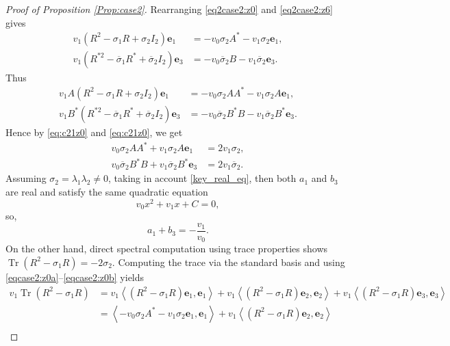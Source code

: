 \documentclass[12pt, reqno]{amsart}
\theoremstyle{definition}
\theoremstyle{remark}
\numberwithin{equation}{section}
\begin{document}
\begin{proof}[Proof of Proposition \ref{Prop:case2}]
	Rearranging \eqref{eq2case2:z0} and \eqref{eq2case2:z6} gives
	\begin{align}
		v_1 \left( R^2 - \sigma_1 R + \sigma_2 I_2 \right) \mathbf{e}_1 &= -v_0 \sigma_2 A^* - v_1\sigma_2 \mathbf{e}_1, \label{eqcase2:z0a} \\
		v_1 \left( R^{*2} - \overline{\sigma}_1 R^* + \overline{\sigma}_2 I_2 \right) \mathbf{e}_3 &= -v_0 \overline{\sigma}_2 B - v_1\overline{\sigma}_2 \mathbf{e}_3. \label{eqcase2:z0b}
	\end{align}
Thus
\begin{align*}
	v_1 A \left( R^2 - \sigma_1 R + \sigma_2 I_2 \right) \mathbf{e}_1 &= -v_0 \sigma_2 AA^* - v_1\sigma_2 A\mathbf{e}_1, \\
	v_1 B^*\left( R^{*2} - \overline{\sigma}_1 R^* + \overline{\sigma}_2 I_2 \right) \mathbf{e}_3 &= -v_0 \overline{\sigma}_2 B^*B - v_1\overline{\sigma}_2 B^*\mathbf{e}_3. 
\end{align*}
Hence by \eqref{eq:c21z0} and \eqref{eq:c21z0}, we get
\begin{align*}
v_0 \sigma_2 AA^* + v_1\sigma_2 A\mathbf{e}_1 &= 2v_1\sigma_2, \\
v_0 \overline{\sigma}_2 B^*B + v_1\overline{\sigma}_2 B^*\mathbf{e}_3 &=2v_1\overline{\sigma}_2 . 
\end{align*}
	Assuming $\sigma_2 = \lambda_1\lambda_2 \neq 0$, taking in account \eqref{key_real_eq}, then both $a_1$ and $b_3$ are real and satisfy the same quadratic equation
	\begin{equation}\label{quadratic_general}
		v_0 x^2 + v_1 x + C = 0,
	\end{equation}
	so,
	\begin{equation}\label{sum_roots}
		a_1 + b_3 = -\frac{v_1}{v_0}.
	\end{equation}
	On the other hand, direct spectral computation using trace properties shows  $\operatorname{Tr}(R^2 - \sigma_1 R) = -2\sigma_2$. Computing the trace via the standard basis and using \eqref{eqcase2:z0a}--\eqref{eqcase2:z0b} yields
	\begin{align*}
		v_1 \operatorname{Tr}(R^2 - \sigma_1 R) &=v_1\left\langle (R^2 - \sigma_1 R)\mathbf{e}_1, \mathbf{e}_1 \right\rangle+v_1\left\langle (R^2 - \sigma_1 R)\mathbf{e}_2, \mathbf{e}_2 \right\rangle+v_1\left\langle (R^2 - \sigma_1 R)\mathbf{e}_3, \mathbf{e}_3 \right\rangle \\
		&= \left\langle -v_0 \sigma_2 A^* - v_1\sigma_2 \mathbf{e}_1, \mathbf{e}_1 \right\rangle + v_1\left\langle (R^2 - \sigma_1 R)\mathbf{e}_2, \mathbf{e}_2 \right\rangle \\

\end{align*}
\end{proof}
\end{document}
